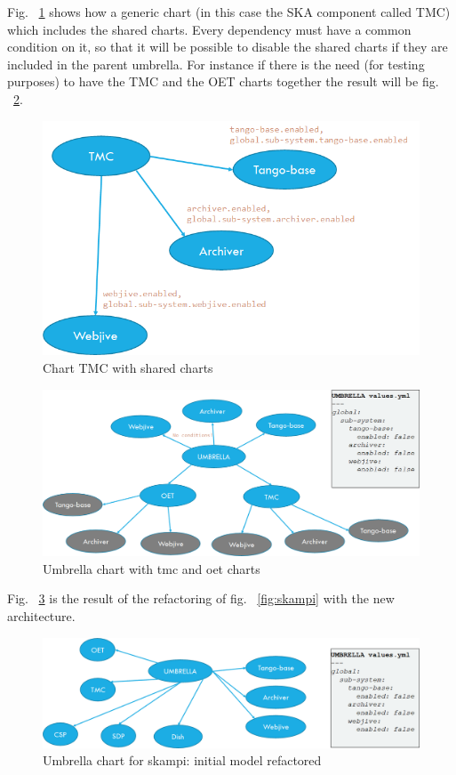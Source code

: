 \documentclass[a4paper]{spie}  %
\begin{document}
Fig. ~\ref{fig:tmc_shared_charts} shows how a generic chart (in this case the SKA component called TMC) which includes the shared charts. Every dependency must have a common condition on it, so that it will be possible to disable the shared charts if they are included in the parent umbrella. For instance if there is the need (for testing purposes) to have the TMC and the OET charts together the result will be fig. ~\ref{fig:tmc_oet_umbrella}.

\begin{figure}[!htb]
   \centering
   \includegraphics*[width=0.5\columnwidth]{tmc_shared_charts}
   \caption{Chart TMC with shared charts}
   \label{fig:tmc_shared_charts}
\end{figure}

\begin{figure}[!htb]
   \centering
   \includegraphics*[width=0.8\columnwidth]{tmc_oet_umbrella}
   \caption{Umbrella chart with tmc and oet charts}
   \label{fig:tmc_oet_umbrella}
\end{figure}

Fig. ~\ref{fig:umbrella_skampi} is the result of the refactoring of fig. ~\ref{fig:skampi} with the new architecture.

\begin{figure}[!htb]
   \centering
   \includegraphics*[width=1\columnwidth]{umbrella_skampi}
   \caption{Umbrella chart for skampi: initial model refactored}
   \label{fig:umbrella_skampi}
\end{figure}
\end{document}
